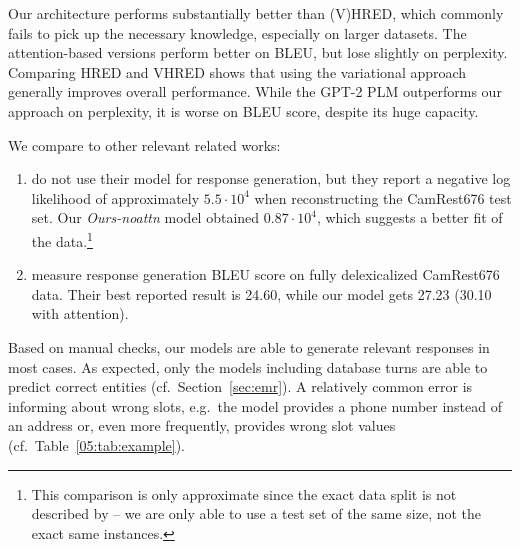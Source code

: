 Our architecture performs substantially better than (V)HRED, which commonly fails to pick up the necessary knowledge, especially on larger datasets.
The attention-based versions perform better on BLEU, but lose slightly on perplexity.
Comparing HRED and VHRED shows that using the variational approach generally improves overall performance.
While the GPT-2 PLM outperforms our approach on perplexity, it is worse on BLEU score, despite its huge capacity.

We compare to other relevant related works:
\begin{enumerate}
\item \citet{shi2019unsupervised} do not use their model for response generation, but they report a negative log likelihood of approximately $5.5 \cdot 10^{4}$ when reconstructing the CamRest676 test set. Our \emph{Ours-noattn} model obtained $0.87 \cdot 10^{4}$, which suggests a better fit of the data.\footnote{This comparison is only approximate since the exact data split is not described by \citet{shi2019unsupervised} -- we are only able to use a test set of the same size, not the exact same instances.}
\item \citet{wen2017latent} measure response generation BLEU score on fully delexicalized CamRest676 data. Their best reported result is 24.60, while our model gets 27.23 (30.10 with attention).
\end{enumerate}

Based on manual checks,
our models are able to generate relevant responses in most cases.
As expected, only the models including database turns are able to predict correct entities (cf.~Section~\ref{sec:emr}).
A relatively common error is informing about wrong slots, e.g.\ the model provides a phone number instead of an address or, even more frequently, provides wrong slot values (cf.~Table~\ref{05:tab:example}).

